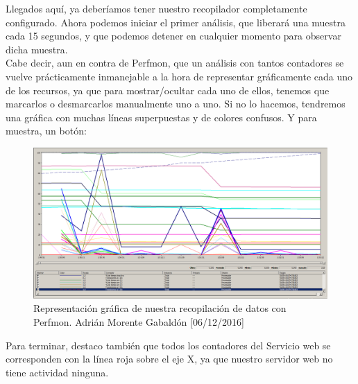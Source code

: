 Llegados aquí, ya deberíamos tener nuestro recopilador completamente configurado. Ahora podemos iniciar el primer análisis, que liberará una muestra cada 15 segundos, y que podemos detener en cualquier momento para observar dicha muestra. \\
Cabe decir, aun en contra de Perfmon, que un análisis con tantos contadores se vuelve prácticamente inmanejable a la hora de representar gráficamente cada uno de los recursos, ya que para mostrar/ocultar cada uno de ellos, tenemos que marcarlos o desmarcarlos manualmente uno a uno. Si no lo hacemos, tendremos una gráfica con muchas líneas superpuestas y de colores confusos. Y para muestra, un botón:
\begin{figure}[H]
	\centering
	\includegraphics[scale=0.35]{recop4}
	\caption{Representación gráfica de nuestra recopilación de datos con Perfmon. Adrián Morente Gabaldón [06/12/2016]}
	\label{figura15}
\end{figure}
Para terminar, destaco también que todos los contadores del Servicio web se corresponden con la línea roja sobre el eje X, ya que nuestro servidor web no tiene actividad ninguna.

